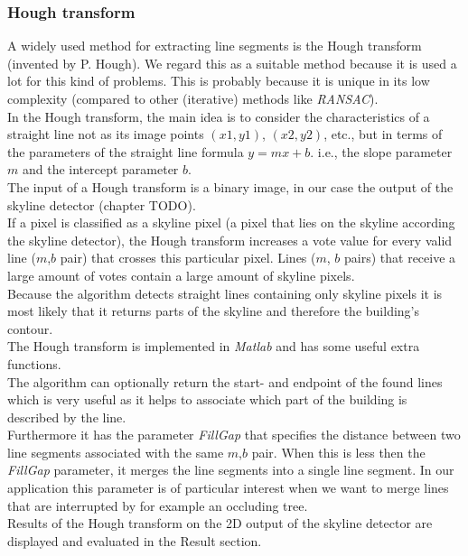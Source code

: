 \documentclass[10pt]{article}
\begin{document}
{\subsubsection{Hough transform}
	A widely used method for extracting line segments is the Hough transform
	(invented by P. Hough).  We regard this as a suitable method because it is
	used a lot for this kind of problems. This is probably because it is unique
	in its low complexity (compared to other (iterative) methods like
	\emph{RANSAC}).\\
	In the Hough transform, the main idea is to consider the characteristics of a
	straight line not as its image points $(x1, y1)$, $(x2, y2)$, etc., but in
	terms of the parameters of the straight line formula $y = mx + b$. i.e., the
	slope parameter $m$ and the intercept parameter $b$.\\
	The input of a Hough transform is a binary image, in our case the output of 
	the skyline detector (chapter TODO).\\
	If a pixel is classified as a skyline pixel (a pixel that lies on the
	skyline according the skyline detector), the Hough transform increases
	a vote value for every valid line ($m$,$b$ pair) that crosses this
	particular pixel.  Lines ($m$, $b$ pairs) that receive a large amount of votes
	contain a large amount of skyline pixels.\\
	Because the algorithm detects straight lines containing only skyline pixels it is
	most likely that it returns parts of the skyline and therefore the building's contour. \\
	The Hough transform is implemented in \emph{Matlab} and has some useful extra functions.\\
	The algorithm can optionally return the start- and endpoint of the found lines 
	which is very useful as it helps to associate which part of the building is
	described by the line.\\
	Furthermore it has the parameter \emph{FillGap} that specifies the distance
	between two line segments associated with the same $m$,$b$ pair.  When this
	is less then the \emph{FillGap} parameter, it merges the line segments into
	a single line segment. In our application this parameter is of particular
	interest when we want to merge lines that are interrupted by for example an
	occluding tree.\\
	Results of the Hough transform on the 2D output of the skyline detector are
	displayed and evaluated in the Result section.



}
\end{document}
